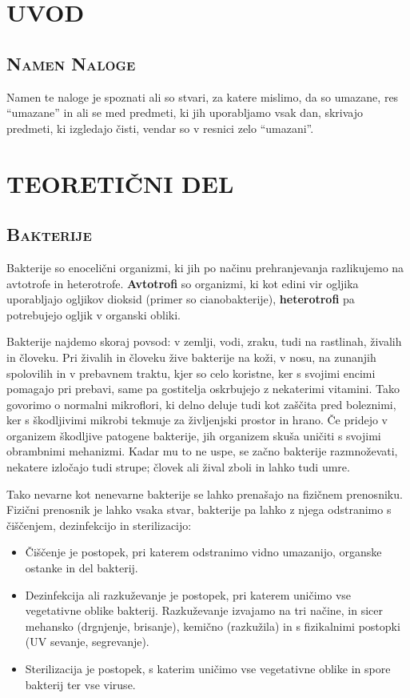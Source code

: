 \documentclass[12pt, a4paper]{report}
\begin{document}
\chapter{UVOD}

\section{\textsc{Namen Naloge}}

Namen te naloge je spoznati ali so stvari, za katere mislimo, da so umazane, res ``umazane'' in ali se med predmeti, ki jih uporabljamo vsak dan, skrivajo predmeti, ki izgledajo čisti, vendar so v resnici zelo ``umazani''.

\chapter{TEORETIČNI DEL}

\section{\textsc{Bakterije}}

Bakterije so enocelični organizmi, ki jih po načinu prehranjevanja razlikujemo na avtotrofe in heterotrofe. \textbf{Avtotrofi} so organizmi, ki kot edini vir ogljika uporabljajo ogljikov dioksid (primer so cianobakterije), \textbf{heterotrofi} pa potrebujejo ogljik v organski obliki.

Bakterije najdemo skoraj povsod: v zemlji, vodi, zraku, tudi na rastlinah, živalih in človeku. Pri živalih in človeku žive bakterije na koži, v nosu, na zunanjih spolovilih in v prebavnem traktu, kjer so celo koristne, ker s svojimi encimi pomagajo pri prebavi, same pa gostitelja oskrbujejo z nekaterimi vitamini. Tako govorimo o normalni mikroflori, ki delno deluje tudi kot zaščita pred boleznimi, ker s škodljivimi mikrobi tekmuje za življenjski prostor in hrano. Če pridejo v organizem škodljive patogene bakterije, jih organizem skuša uničiti s svojimi obrambnimi mehanizmi. Kadar mu to ne uspe, se začno bakterije razmnoževati, nekatere izločajo tudi strupe; človek ali žival zboli in lahko tudi umre.

Tako nevarne kot nenevarne bakterije se lahko prenašajo na fizičnem prenosniku. Fizični prenosnik je lahko vsaka stvar, bakterije pa lahko z njega odstranimo s čiščenjem, dezinfekcijo in sterilizacijo:
\begin{itemize}
\item Čiščenje je postopek, pri katerem odstranimo vidno umazanijo, organske ostanke in del bakterij.
\item Dezinfekcija ali razkuževanje je postopek, pri katerem uničimo vse vegetativne oblike bakterij. Razkuževanje izvajamo na tri načine, in sicer mehansko (drgnjenje, brisanje), kemično (razkužila) in s fizikalnimi postopki (UV sevanje, segrevanje).
\item Sterilizacija je postopek, s katerim uničimo vse vegetativne oblike in spore bakterij ter vse viruse.
\end{itemize}
\end{document}
